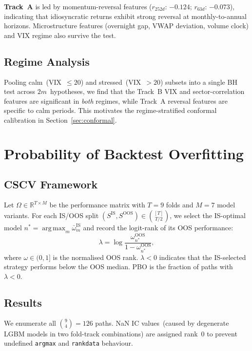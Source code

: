\documentclass[journal]{IEEEtran}
\newcommand{\R}{\mathbb{R}}
\DeclareMathOperator*{\argmax}{arg\,max}
\begin{document}
\noindent\textbf{Track~A} is led by momentum-reversal features
($r_{252d}$: $-0.124$; $r_{63d}$: $-0.073$), indicating that
idiosyncratic returns exhibit strong reversal at monthly-to-annual
horizons.
Microstructure features (overnight gap, VWAP deviation, volume clock)
and VIX regime also survive the test.

\subsection{Regime Analysis}
Pooling calm~(VIX~$\leq 20$) and stressed~(VIX~$>20$) subsets into a
single BH test across $2m$~hypotheses, we find that the Track~B
VIX and sector-correlation features are significant in \emph{both}
regimes, while Track~A reversal features are specific to calm periods.
This motivates the regime-stratified conformal calibration in
Section~\ref{sec:conformal}.

\section{Probability of Backtest Overfitting}
\label{sec:pbo}

\subsection{CSCV Framework}
Let $\Omega \in \R^{T\times M}$ be the performance matrix with
$T=9$ folds and $M=7$ model variants.
For each IS/OOS split $(S^\text{IS}, S^\text{OOS}) \in
\binom{[T]}{T/2}$, we select the IS-optimal model
$n^* = \argmax_m \bar\omega_{m}^\text{IS}$ and record the
logit-rank of its OOS performance:
\begin{equation}
  \lambda = \log\frac{\omega_{n^*}^\text{OOS}}{1 - \omega_{n^*}^\text{OOS}},
\end{equation}
where $\omega \in (0,1]$ is the normalised OOS rank.
$\lambda < 0$ indicates that the IS-selected strategy performs below
the OOS median.
PBO is the fraction of paths with $\lambda < 0$.

\subsection{Results}
We enumerate all $\binom{9}{4} = 126$ paths.
NaN IC values~(caused by degenerate LGBM models in two fold-track
combinations) are assigned rank~$0$ to prevent undefined
\texttt{argmax} and \texttt{rankdata} behaviour.
\end{document}
